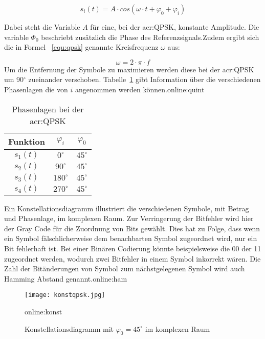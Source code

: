 \begin{equation}
	\label{equ:qpsk}
	s_{i}(t) = A \cdot cos(\omega \cdot t+\varphi_{0}+\varphi_{i})
\end{equation}

Dabei steht die Variable $A$ für eine, bei der \gls{acr:QPSK}, konstante Amplitude. Die variable $\varPhi_{0}$ beschriebt zusätzlich die Phase des Referenzsignals.Zudem ergibt sich die in Formel ~\ref{equ:qpsk} genannte Kreisfrequenz $\omega$ aus:

\begin{equation}
	\label{equ:omega}
	\omega = 2 \cdot \pi \cdot f
\end{equation}
Um die Entfernung der Symbole zu maximieren werden diese bei der \gls{acr:QPSK} um 90$^\circ$ zueinander verschoben. Tabelle~\ref{tab:qpsk} gibt Information über die verschiedenen Phasenlagen die von $i$ angenommen werden können.\gls{online:quint}
\begin{table}[htb]
\centering
		\begin{tabular}[h]{ccc}	
			\toprule
			Funktion & $\varphi_{i}$& $\varphi_{0}$ \\
			\midrule
			$s_{1}(t)$ & $0^\circ$ & $45^\circ$ \\
			$s_{2}(t)$ & $90^\circ$ & $45^\circ$\\
			$s_{3}(t)$ & $180^\circ$ & $45^\circ$\\
			$s_{4}(t)$ & $270^\circ$& $45^\circ$ \\
			\bottomrule
		\end{tabular}
		\caption{Phasenlagen bei der \gls{acr:QPSK}}
		\label{tab:qpsk}
\end{table}

Ein Konstellationsdiagramm illustriert die verschiedenen Symbole, mit Betrag und Phasenlage, im komplexen Raum. Zur Verringerung der Bitfehler wird hier der Gray Code für die Zuordnung von Bits gewählt. Dies hat zu Folge, dass wenn ein Symbol fälschlicherweise dem benachbarten Symbol zugeordnet wird, nur ein Bit fehlerhaft ist. Bei einer Binären Codierung könnte beispielsweise die 00 der 11 zugeordnet werden, wodurch zwei Bitfehler in einem Symbol inkorrekt wären. Die Zahl der Bitänderungen von Symbol zum nächstgelegenen Symbol wird auch Hamming Abstand genannt.\gls{online:ham}
\begin{figure}[H]
	\centering
	\texttt{[image: konstqpsk.jpg]}
	\caption[Konstellationsdiagramm mit $\varphi_{0}=45^\circ$ im komplexen Raum]{Konstellationsdiagramm mit $\varphi_{0}=45^\circ$ im komplexen Raum} 
	\gls{online:konst}
	\label{fig:konstqpsk}
\end{figure}

